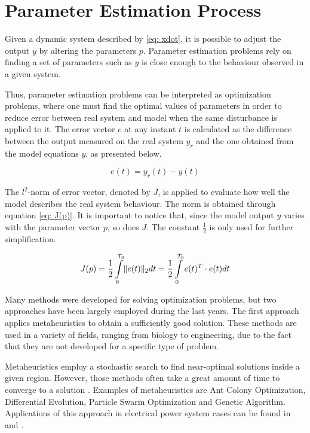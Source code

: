 \chapter{Parameter Estimation Process}
\label{ch: Estimation}

Given a dynamic system described by \eqref{eq: xdot}, it is possible to adjust the output $y$ by altering the parameters $p$. Parameter estimation problems rely on finding a set of parameters such as $y$ is close enough to the behaviour observed in a given system.

Thus, parameter estimation problems can be interpreted as optimization problems, where one must find the optimal values of parameters in order to reduce error between real system and model when the same disturbance is applied to it. The error vector $e$ at any instant $t$ is calculated as the difference between the output measured on the real system $y_{r}$ and the one obtained from the model equations $y$, as presented below.

\begin{equation}
	e(t) = y_{r}(t) - y(t)
	\label{eq: error_vector}
\end{equation}

The $l^{2}$-norm of error vector, denoted by $J$, is applied to evaluate how well the model describes the real system behaviour. The norm is obtained through equation \eqref{eq: J(p)}. It is important to notice that, since the model output $y$ varies with the parameter vector $p$, so does $J$. The constant $\frac{1}{2}$ is only used for further simplification.

\begin{equation}
	J(p) = \frac{1}{2} \int\displaylimits_{0}^{T_{0}}\lVert e(t)\rVert_{2}dt = \frac{1}{2}\int\displaylimits_{0}^{T_{0}}e(t)^{T}\cdot e(t)dt
	\label{eq: J(p)}
\end{equation}

Many methods were developed for solving optimization problems, but two approaches have been largely employed during the last years. The first approach applies metaheuristics to obtain a sufficiently good solution. These methods are used in a variety of fields, ranging from biology to engineering, due to the fact that they are not developed for a specific type of problem.

Metaheuristics employ a stochastic search to find near-optimal solutions inside a given region. However, those methods often take a great amount of time to converge to a solution \cite{Blum2003}. Examples of metaheuristics are Ant Colony Optimization, Differential Evolution, Particle Swarm Optimization and Genetic Algorithm. Applications of this approach in electrical power system cases can be found in \cite{Todorovski2006} and \cite{Yoshida2000}.

